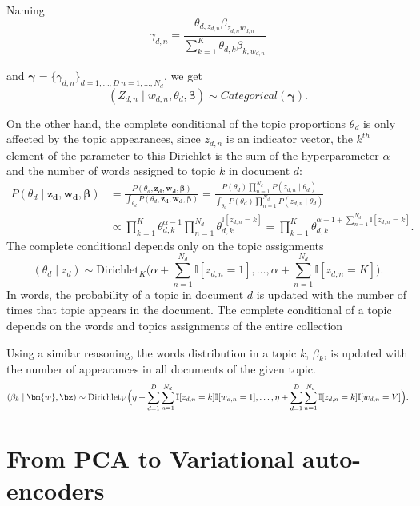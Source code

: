 Naming 
\[
  \gamma_{d,n} = \frac{\theta_{d,z_{d,n}}\beta_{z_{d,n}w_{d,n}}}{\sum_{k=1}^K \theta_{d,k}\beta_{k,w_{d,n}}}
\] 

and \(\bm{\gamma} = \{\gamma_{d,n}\}_{d=1,\dots,D \ n=1,\dots,N_{d}}\), we get
\[
  (Z_{d,n} \mid w_{d,n}, \theta_{d}, \bm{\beta}) \sim Categorical(\bm{\gamma}).
\]

On the other hand, the complete conditional of the topic proportions \(\theta_{d}\) is only affected by the topic appearances, since \(z_{d,n}\) is an indicator vector, the \(k^{th}\) element of the parameter to this Dirichlet is the sum of the hyperparameter \(\alpha\) and the number of words assigned to topic \(k\) in document \(d\):
\[
  \begin{aligned}
    P(\theta_{d} \mid \bm{z_{d}},\bm{w_{d}}, \bm{\beta}) &= \frac{P(\theta_{d}, \bm{z_{d}}, \bm{w_{d}}, \bm{\beta})}{\int_{\theta_{d}} P(\theta_{d}, \bm{z_{d}}, \bm{w_{d}}, \bm{\beta})} = \frac{ P(\theta_{d})\prod_{n=1}^{N_{d}}P(z_{d,n}\mid \theta_{d}) }{ \int_{\theta_{d}}  P(\theta_{d})\prod_{n=1}^{N_{d}}P(z_{d,n}\mid \theta_{d})  }\\
    &\propto \prod_{k=1}^{K}\theta_{d,k}^{\alpha-1} \prod_{n=1}^{N_{d}}\theta_{d,k}^{\mathbb{I}[z_{d,n}=k]} = \prod_{k=1}^{K}\theta_{d,k}^{\alpha -1 + \sum_{n=1}^{N_{d}} \mathbb{I}[z_{d,n}=k] }.
  \end{aligned}
\]
The complete conditional depends only on the topic assignments
\[
  (\theta_{d} \mid z_{d}) \sim \text{Dirichlet}_{K}\Big(\alpha + \sum_{n=1}^{N_{d}} \mathbb{I}[z_{d,n}=1],\dots, \alpha + \sum_{n=1}^{N_{d}} \mathbb{I}[z_{d,n}=K]\Big).
\]
In words, the probability of a topic in document \(d\) is updated with the number of times that topic appears in the document. The complete conditional of a topic depends on the words and topics assignments of the entire collection

Using a similar reasoning, the words distribution in a topic \(k\), \(\beta_{k}\), is updated with the number of appearances in all documents of the given topic.
\[
  (\beta_{k} \mid \bm{w}, \bz) \sim \text{Dirichlet}_{V}\Big(\eta + \sum_{d=1}^{D}\sum_{n=1}^{N_{d}}\mathbb{I}[z_{d,n} = k]\mathbb{I}[w_{d,n} = 1], \dots, \eta + \sum_{d=1}^{D}\sum_{n=1}^{N_{d}}\mathbb{I}[z_{d,n} = k]\mathbb{I}[w_{d,n} = V]\Big).
\]

\section{From PCA to Variational auto-encoders}

